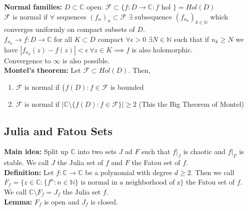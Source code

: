 \documentclass[12pt]{article}
\begin{document}
\textbf{Normal families:} $D \subset \mathbb{C}$ open: $\mathcal{F} \subset \{f: D \to \mathbb{C} : f \text{ hol }\} = Hol(D)$\\

$\mathcal{F}$ is normal if $\forall$ sequences $(f_n)_n \subset \mathcal{F} \; \exists$ subsequence $(f_{n_k})_{k \in \mathbb{N}}$ which converges uniformly on compact subsets of $D$.\\

$f_{n_k} \to f: D \to \mathbb{C}$ for all $K \subset D$ compact $\forall \epsilon > 0$ $\exists N \in \mathbb{N}$ such that if $n_k \geq N$ we have $|f_{n_k}(z) - f(z)| < \epsilon \ \forall z \in K \implies f$ is also holomorphic.\\

Convergence to $\infty$ is also possible.\\

\textbf{Montel's theorem:} Let $\mathcal{F} \subset Hol(D)$. Then,
\begin{enumerate}[label=(\alph*)]

\item $\mathcal{F}$ is normal if $\{f(D): f \in \mathcal{F}$ is bounded

\item $\mathcal{F}$ is normal if $|\mathbb{C} \setminus \{f(D): f \in \mathcal{F}\}| \geq 2$ (This the Big Theorem of Montel)

\end{enumerate}

\subsection{Julia and Fatou Sets}

\textbf{Main idea:} Split up $\mathbb{C}$ into two sets $J$ ad $F$ such that $f|_J$ is chaotic and $f|_F$ is stable. We call $J$ the Julia set of $f$ and $F$ the Fatou set of $f$.\\

\textbf{Definition:} Let $f: \mathbb{C} \to \mathbb{C}$ be a polynomial with degree $d \geq 2$. Then we call $F_{f} = \{z \in \mathbb{C}: \{f^n : n \in \mathbb{N}\} \text{ is normal in a neighborhood of z}\}$ the Fatou set of $f$.\\

We call $\mathbb{C} \setminus F_{f} = J_{f}$ the Julia set $f$.\\

\textbf{Lemma:} $F_f$ is open and $J_f$ is closed.\\
\end{document}
